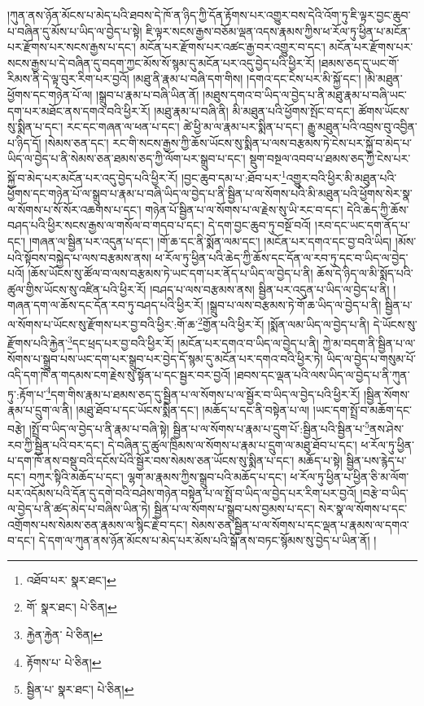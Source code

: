 །ཀུན་ནས་ཉོན་མོངས་པ་མེད་པའི་ཐབས་དེ་ཁོ་ན་ཉིད་ཀྱི་དོན་རྟོགས་པར་འགྱུར་བས་དེའི་འོག་ཏུ་ཇི་ལྟར་བྱང་ཆུབ་པ་བཞིན་དུ་མོས་པ་ཡིད་ལ་བྱེད་པ་སྟེ། ཇི་ལྟར་སངས་རྒྱས་བཅོམ་ལྡན་འདས་རྣམས་ཀྱིས་ཕ་རོལ་ཏུ་ཕྱིན་པ་མངོན་པར་རྫོགས་པར་སངས་རྒྱས་པ་དང་། མངོན་པར་རྫོགས་པར་འཚང་རྒྱ་བར་འགྱུར་བ་དང་། མངོན་པར་རྫོགས་པར་སངས་རྒྱས་པ་དེ་བཞིན་དུ་བདག་ཀྱང་མོས་སོ་སྙམ་དུ་མངོན་པར་འདུ་བྱེད་པའི་ཕྱིར་རོ། །ཐམས་ཅད་དུ་ཡང་གོ་རིམས་ནི་དེ་ལྟ་བུར་རིག་པར་བྱའོ། །མཐུ་ནི་རྣམ་པ་བཞི་དག་གིས། །དགའ་དང་ངེས་པར་མི་སྐྱོ་དང་། །མི་མཐུན་ཕྱོགས་དང་གཉེན་པོ་ལ། །སྒྲུབ་པ་རྣམ་པ་བཞི་ཡིན་ནོ། །མཐུས་དགའ་བ་ཡིད་ལ་བྱེད་པ་ནི་མཐུ་རྣམ་པ་བཞི་ཡང་དག་པར་མཐོང་ནས་དགའ་བའི་ཕྱིར་རོ། །མཐུ་རྣམ་པ་བཞི་ནི། མི་མཐུན་པའི་ཕྱོགས་སྤོང་བ་དང་། ཚོགས་ཡོངས་སུ་སྨིན་པ་དང་། རང་དང་གཞན་ལ་ཕན་པ་དང་། ཚེ་ཕྱི་མ་ལ་རྣམ་པར་སྨིན་པ་དང་། རྒྱུ་མཐུན་པའི་འབྲས་བུ་འབྱིན་པ་ཉིད་དོ། །སེམས་ཅན་དང་། རང་གི་སངས་རྒྱས་ཀྱི་ཆོས་ཡོངས་སུ་སྨིན་པ་ལས་བརྩམས་ཏེ་ངེས་པར་སྐྱོ་བ་མེད་པ་ཡིད་ལ་བྱེད་པ་ནི་སེམས་ཅན་ཐམས་ཅད་ཀྱི་ལོག་པར་སྒྲུབ་པ་དང་། སྡུག་བསྔལ་འབབ་པ་ཐམས་ཅད་ཀྱི་ངེས་པར་སྐྱོ་བ་མེད་པར་མངོན་པར་འདུ་བྱེད་པའི་ཕྱིར་རོ། །བྱང་ཆུབ་དམ་པ་:ཐོབ་པར་\footnote{འཐོབ་པར་  སྣར་ཐང་། }འགྱུར་བའི་ཕྱིར་མི་མཐུན་པའི་ཕྱོགས་དང་གཉེན་པོ་ལ་སྒྲུབ་པ་རྣམ་པ་བཞི་ཡིད་ལ་བྱེད་པ་ནི་སྦྱིན་པ་ལ་སོགས་པའི་མི་མཐུན་པའི་ཕྱོགས་སེར་སྣ་ལ་སོགས་པ་སོ་སོར་འཆགས་པ་དང་། གཉེན་པོ་སྦྱིན་པ་ལ་སོགས་པ་ལ་རྗེས་སུ་ཡི་རང་བ་དང་། དེའི་ཆེད་ཀྱི་ཆོས་བཤད་པའི་ཕྱིར་སངས་རྒྱས་ལ་གསོལ་བ་གདབ་པ་དང་། དེ་དག་བྱང་ཆུབ་ཏུ་བསྔོ་བའོ། །རབ་དང་ཡང་དག་ནོད་པ་དང་། །གཞན་ལ་སྦྱིན་པར་འདུན་པ་དང་། །གོ་ཆ་དང་ནི་སྨོན་ལམ་དང་། །མངོན་པར་དགའ་དང་བྱ་བའི་ཡིད། །མོས་པའི་སྟོབས་བསྐྱེད་པ་ལས་བརྩམས་ནས། ཕ་རོལ་ཏུ་ཕྱིན་པའི་ཆེད་ཀྱི་ཆོས་དང་དོན་ལ་རབ་ཏུ་དང་བ་ཡིད་ལ་བྱེད་པའོ། །ཆོས་ཡོངས་སུ་ཚོལ་བ་ལས་བརྩམས་ཏེ་ཡང་དག་པར་ནོད་པ་ཡིད་ལ་བྱེད་པ་ནི། ཆོས་དེ་ཉིད་ལ་མི་སྨོད་པའི་ཚུལ་གྱིས་ཡོངས་སུ་འཛིན་པའི་ཕྱིར་རོ། །བཤད་པ་ལས་བརྩམས་ནས། སྦྱིན་པར་འདུན་པ་ཡིད་ལ་བྱེད་པ་ནི། །གཞན་དག་ལ་ཆོས་དང་དོན་རབ་ཏུ་བཤད་པའི་ཕྱིར་རོ། །སྒྲུབ་པ་ལས་བརྩམས་ཏེ་གོ་ཆ་ཡིད་ལ་བྱེད་པ་ནི། སྦྱིན་པ་ལ་སོགས་པ་ཡོངས་སུ་རྫོགས་པར་བྱ་བའི་ཕྱིར་:གོ་ཆ་\footnote{གོ་  སྣར་ཐང་།  པེ་ཅིན། }གྱོན་པའི་ཕྱིར་རོ། །སྨོན་ལམ་ཡིད་ལ་བྱེད་པ་ནི། དེ་ཡོངས་སུ་རྫོགས་པའི་རྐྱེན་\footnote{རྐྱེན་རྐྱེན་  པེ་ཅིན། }དང་ཕྲད་པར་བྱ་བའི་ཕྱིར་རོ། །མངོན་པར་དགའ་བ་ཡིད་ལ་བྱེད་པ་ནི། ཀྱེ་མ་བདག་ནི་སྦྱིན་པ་ལ་སོགས་པ་སྒྲུབ་པས་ཡང་དག་པར་སྒྲུབ་པར་བྱེད་དོ་སྙམ་དུ་མངོན་པར་དགའ་བའི་ཕྱིར་ཏེ། ཡིད་ལ་བྱེད་པ་གསུམ་པོ་འདི་དག་ཁོ་ན་གདམས་ངག་རྗེས་སུ་སྟོན་པ་དང་སྦྱར་བར་བྱའོ། །ཐབས་དང་ལྡན་པའི་ལས་ཡིད་ལ་བྱེད་པ་ནི་ཀུན་ཏུ་:རྟོག་པ་\footnote{རྟོགས་པ་  པེ་ཅིན། }དག་གིས་རྣམ་པ་ཐམས་ཅད་དུ་སྦྱིན་པ་ལ་སོགས་པ་ལ་སྦྱོར་བ་ཡིད་ལ་བྱེད་པའི་ཕྱིར་རོ། །སྦྱིན་སོགས་རྣམ་པ་དྲུག་ལ་ནི། །མཐུ་ཐོབ་པ་དང་ཡོངས་སྨིན་དང་། །མཆོད་པ་དང་ནི་བསྟེན་པ་ལ། །ཡང་དག་སྤྲོ་བ་མཆོག་དང་བརྩེ། །སྤྲོ་བ་ཡིད་ལ་བྱེད་པ་ནི་རྣམ་པ་བཞི་སྟེ། སྦྱིན་པ་ལ་སོགས་པ་རྣམ་པ་དྲུག་པོ་:སྦྱིན་པའི་སྦྱིན་པ་\footnote{སྦྱིན་པ་  སྣར་ཐང་།  པེ་ཅིན། }ནས་ཤེས་རབ་ཀྱི་སྦྱིན་པའི་བར་དང་། དེ་བཞིན་དུ་ཚུལ་ཁྲིམས་ལ་སོགས་པ་རྣམ་པ་དྲུག་ལ་མཐུ་ཐོབ་པ་དང་། ཕ་རོལ་ཏུ་ཕྱིན་པ་དག་ཁོ་ནས་བསྡུ་བའི་དངོས་པོའི་སྦྱོར་བས་སེམས་ཅན་ཡོངས་སུ་སྨིན་པ་དང་། མཆོད་པ་སྟེ། སྦྱིན་པས་རྙེད་པ་དང་། བཀུར་སྟིའི་མཆོད་པ་དང་། ལྷག་མ་རྣམས་ཀྱིས་སྒྲུབ་པའི་མཆོད་པ་དང་། ཕ་རོལ་ཏུ་ཕྱིན་པ་ཕྱིན་ཅི་མ་ལོག་པར་འདོམས་པའི་དོན་དུ་དགེ་བའི་བཤེས་གཉེན་བསྟེན་པ་ལ་སྤྲོ་བ་ཡིད་ལ་བྱེད་པར་རིག་པར་བྱའོ། །བརྩེ་བ་ཡིད་ལ་བྱེད་པ་ནི་ཚད་མེད་པ་བཞིས་ཡིན་ཏེ། སྦྱིན་པ་ལ་སོགས་པ་སྒྲུབ་པས་བྱམས་པ་དང་། སེར་སྣ་ལ་སོགས་པ་དང་འགྲོགས་པས་སེམས་ཅན་རྣམས་ལ་སྙིང་རྗེ་བ་དང་། སེམས་ཅན་སྦྱིན་པ་ལ་སོགས་པ་དང་ལྡན་པ་རྣམས་ལ་དགའ་བ་དང་། དེ་དག་ལ་ཀུན་ནས་ཉོན་མོངས་པ་མེད་པར་མོས་པའི་སྒོ་ནས་བཏང་སྙོམས་སུ་བྱེད་པ་ཡིན་ནོ། །
